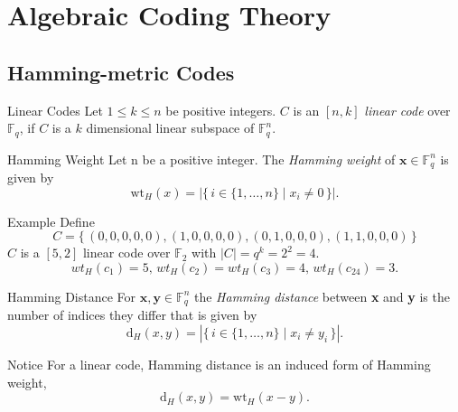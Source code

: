 \section{Algebraic Coding Theory}

\subsection{Hamming-metric Codes}
\begin{frame}[allowframebreaks]
        \begin{block}{Linear Codes}
         Let $1 \leq k \leq n$ be positive integers. $C$ is an $[n, k]$ \textit{linear code} over $\mathbb F_q$, if $C$ is a $k$ dimensional linear subspace of $\mathbb F_q^n$.
        \end{block} 

        \begin{block}{Hamming Weight}
        Let n be a positive integer. The \textit{Hamming weight} of 
        $\textbf{x} \in \mathbb F_q^n$ is given by
        \[
        \mathrm{wt}_H(x) = 
        \left| \{\, i \in \{1, \dots, n\} 
        \mid x_i \neq 0 \,\} \right|.
        \]    
        \end{block}

        \begin{exampleblock}{Example}
            Define 
            \[
                C = 
                \{\,
                (0,0,0,0,0), (1,0,0,0,0), (0,1,0,0,0), (1,1,0,0,0)  
                \,\}
            \]
            $C$ is a $[5, 2]$ linear code over $\mathbb{F}_2$ with 
            $|C| = q^k = 2^2 = 4$.
            \[
                wt_H(c_1)=5,\,wt_H(c_2)=wt_H(c_3)=4,\,wt_H(c_24)=3. 
            \] 
        \end{exampleblock}
        
\framebreak

        \begin{block}{Hamming Distance}
        For $\textbf{x}, \textbf{y} \in \mathbb F_q^n$ the \textit{Hamming distance} between \textbf{x} and \textbf{y} is the number of indices they differ that is given by
        \[
        \mathrm{d}_H(x, y) =
        \left| \{\, i \in \{1, \dots, n\} 
        \mid x_i \neq y_i \,\} \right|.
        \]
        \end{block}

        \begin{alertblock}{Notice}  
            For a linear code, Hamming distance is an induced form of Hamming weight,
            \[
                \mathrm{d}_H(x, y) = \mathrm{wt}_H(x-y).
            \]
        \end{alertblock}


\end{frame}
